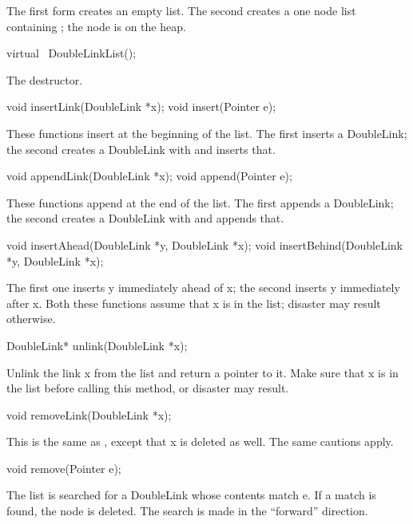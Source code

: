 The first form creates an empty list.  The second creates a one
node list containing ; the node is on the heap.

\begin{example}
virtual ~DoubleLinkList();
\end{example}

The destructor.

\begin{example}
void insertLink(DoubleLink *x);
void insert(Pointer e);
\end{example}

These functions insert at the beginning of the list.  The first inserts
a DoubleLink; the second creates a DoubleLink with 
and inserts that.

\begin{example}
void appendLink(DoubleLink *x);
void append(Pointer e);
\end{example}

These functions append at the end of the list.  The first appends
a DoubleLink; the second creates a DoubleLink with 
and appends that.

\begin{example}
void insertAhead(DoubleLink *y, DoubleLink *x);
void insertBehind(DoubleLink *y, DoubleLink *x);
\end{example}

The first one inserts y immediately ahead of x; the second
inserts y immediately after x.  Both these functions assume
that x is in the list; disaster may result otherwise.

\begin{example}
DoubleLink* unlink(DoubleLink *x);
\end{example}

Unlink the link x from the list and return a pointer to it.
Make sure that x is in the list before calling this method,
or disaster may result.

\begin{example}
void removeLink(DoubleLink *x);
\end{example}

This is the same as , except that x is deleted
as well.  The same cautions apply.

\begin{example}
void remove(Pointer e);
\end{example}

The list is searched for a DoubleLink whose contents match e.  If
a match is found, the node is deleted.  The search is made in the
``forward'' direction.

